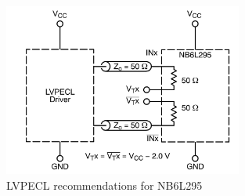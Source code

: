 \begin{figure}[tb]
	\centering
	\includegraphics[width = 0.7\textwidth]{chap/04-theresa/img/delay_lvpecl}
	\caption[NB6L295 Delay Chip Schematic]{LVPECL recommendations for NB6L295 \cite{NB6L295}}
	\label{fig:delay_lvpecl}
\end{figure}


